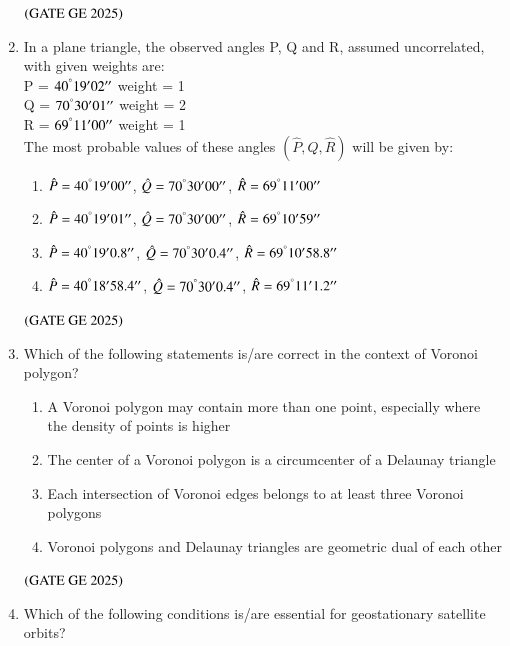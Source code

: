 \documentclass[journal,12pt,onecolumn]{IEEEtran}
\theoremstyle{remark}
\begin{document}
\begin{enumerate}
\begin{enumerate}
\end{enumerate}
\hfill $\left(\text{GATE GE 2025}\right)$
\bigskip
\item In a plane triangle, the observed angles P, Q and R, assumed uncorrelated, with given weights are:\\
P = $40^\degree19'02''$ weight = 1\\
Q = $70^\degree30'01''$ weight = 2\\
R = $69^\degree11'00''$ weight = 1\\
The most probable values of these angles $(\hat{P}, \hat{Q}, \hat{R})$ will be given by:
\begin{enumerate}
\item $\hat{P} = 40^\degree19'00''$, $\hat{Q} = 70^\degree30'00''$, $\hat{R} = 69^\degree11'00''$
\item $\hat{P} = 40^\degree19'01''$, $\hat{Q} = 70^\degree30'00''$, $\hat{R} = 69^\degree10'59''$
\item $\hat{P} = 40^\degree19'0.8''$, $\hat{Q} = 70^\degree30'0.4''$, $\hat{R} = 69^\degree10'58.8''$
\item $\hat{P} = 40^\degree18'58.4''$, $\hat{Q} = 70^\degree30'0.4''$, $\hat{R} = 69^\degree11'1.2''$
\end{enumerate}
\hfill $\left(\text{GATE GE 2025}\right)$
\bigskip
\item Which of the following statements is/are correct in the context of Voronoi polygon?
\begin{enumerate}
\item A Voronoi polygon may contain more than one point, especially where the density of points is higher
\item The center of a Voronoi polygon is a circumcenter of a Delaunay triangle
\item Each intersection of Voronoi edges belongs to at least three Voronoi polygons
\item Voronoi polygons and Delaunay triangles are geometric dual of each other
\end{enumerate}
\hfill $\left(\text{GATE GE 2025}\right)$
\bigskip
\item Which of the following conditions is/are essential for geostationary satellite orbits?

\end{enumerate}
\end{document}
